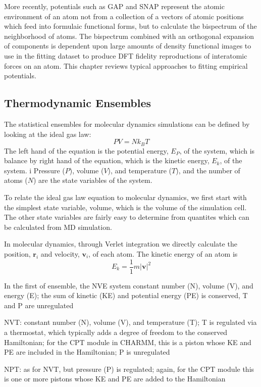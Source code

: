More recently, potentials such as GAP and SNAP represent the atomic environment of an atom not from a collection of a vectors of atomic positions which feed into formulaic functional forms, but to calculate the bispectrum of the neighborhood of atoms.
The bispectrum combined with an orthogonal expansion of components is dependent upon large amounts of density functional images to use in the fitting dataset to produce DFT fidelity reproductions of interatomic forces on an atom.
This chapter reviews typical approaches to fitting empirical potentials.

\subsection{Thermodynamic Ensembles}
The statistical ensembles for molecular dynamics simulations can be defined by looking at the ideal gas law:
\begin{equation}
	PV=Nk_B T
\end{equation}
The left hand of the equation is the potential energy, $E_P$, of the system, which is balance by right hand of the equation, which is the kinetic energy, $E_k$, of the system.  i
Pressure ($P$), volume ($V$), and temperature ($T$), and the number of atoms ($N$) are the state variables of the system.

To relate the ideal gas law equation to molecular dynamics, we first start with the simplest state variable, volume, which is the volume of the simulation cell.  The other state variables are fairly easy to determine from quantites which can be calculated from MD simulation.

In molecular dynamics, through Verlet integration we directly calculate the position, $\bm{r}_i$ and velocity, $\bm{v}_i$, of each atom.  The kinetic energy of an atom is 
\begin{equation}
	E_k=\frac{1}{1} m\lvert \bm{v} \rvert^2
\end{equation}

In the first of ensemble, the NVE system constant number (N), volume (V), and energy (E); the sum of kinetic (KE) and potential energy (PE) is conserved, T and P are unregulated

NVT: constant number (N), volume (V), and temperature (T); T is regulated via a thermostat, which typically adds a degree of freedom to the conserved Hamiltonian; for the CPT module in CHARMM, this is a piston whose KE and PE are included in the Hamiltonian; P is unregulated

NPT: as for NVT, but pressure (P) is regulated; again, for the CPT module this is one or more pistons whose KE and PE are added to the Hamiltonian

